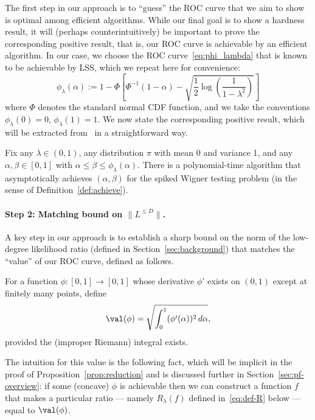 \documentclass[11pt]{article}
\begin{document}
The first step in our approach is to ``guess'' the ROC curve that we aim to show is optimal among efficient algorithms. While our final goal is to show a hardness result, it will (perhaps counterintuitively) be important to prove the corresponding positive result, that is, our ROC curve is achievable by an efficient algorithm. In our case, we choose the ROC curve~\eqref{eq:phi_lambda} that is known to be achievable by LSS, which we repeat here for convenience:
\begin{equation}\label{eq:phi_lambda-2}
\phi_\lambda(\alpha) := 1 - \Phi\left[\Phi^{-1}(1-\alpha) - \sqrt{\frac{1}{2} \log\left(\frac{1}{1-\lambda^2}\right)}\right]
\end{equation}
where $\Phi$ denotes the standard normal CDF function, and we take the conventions $\phi_\lambda(0) = 0$, $\phi_\lambda(1) = 1$. We now state the corresponding positive result, which will be extracted from~\cite{weak-wigner} in a straightforward way.

\begin{theorem}
\label{thm:positive}
Fix any $\lambda \in (0,1)$, any distribution $\pi$ with mean 0 and variance 1, and any $\alpha,\beta \in [0,1]$ with $\alpha \le \beta \le \phi_\lambda(\alpha)$. There is a polynomial-time algorithm that asymptotically achieves $(\alpha,\beta)$ for the spiked Wigner testing problem (in the sense of Definition~\ref{def:achieve}).
\end{theorem}


\paragraph{Step 2: Matching bound on $\|L^{\le D}\|$.}

A key step in our approach is to establish a sharp bound on the norm of the low-degree likelihood ratio (defined in Section~\ref{sec:background}) that matches the ``value'' of our ROC curve, defined as follows.

\begin{definition}
For a function $\phi: [0,1] \to [0,1]$ whose derivative $\phi'$ exists on $(0,1)$ except at finitely many points, define
\begin{equation}\label{eq:def-val}
\val(\phi) = \sqrt{\int_0^1 (\phi'(\alpha))^2 \,d\alpha},
\end{equation}
provided the (improper Riemann) integral exists.
\end{definition}

\noindent The intuition for this value is the following fact, which will be implicit in the proof of Proposition~\ref{prop:reduction} and is discussed further in Section~\ref{sec:pf-overview}: if some (concave) $\phi$ is achievable then we can construct a function $f$ that makes a particular ratio --- namely $R_\lambda(f)$ defined in~\eqref{eq:def-R} below --- equal to $\val(\phi)$.
\end{document}
